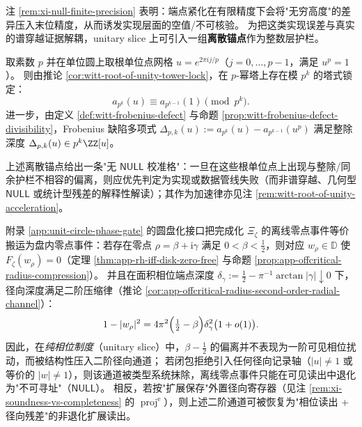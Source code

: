 \begin{remark}\label{rem:xi-null-frobenius-calibration}
注 \ref{rem:xi-null-finite-precision} 表明：端点紧化在有限精度下会将"无穷高度"的差异压入末位精度，从而诱发实现层面的空值/不可核验。
为把这类实现误差与真实的谱穿越证据解耦，unitary slice 上可引入一组\textbf{离散锚点}作为整数层护栏。
\par
取素数 \(p\) 并在单位圆上取根单位点网格
\(
u=e^{2\pi i j/p}
\)（\(j=0,\dots,p-1\)，满足 \(u^p=1\)）。
则由推论 \ref{cor:witt-root-of-unity-tower-lock}，在 \(p\)-幂塔上存在模 \(p^k\) 的塔式锁定：
\[
a_{p^k}(u)\equiv a_{p^{k-1}}(1)\pmod{p^k}.
\]
进一步，由定义 \ref{def:witt-frobenius-defect} 与命题 \ref{prop:witt-frobenius-defect-divisibility}，Frobenius 缺陷多项式
\(
\Delta_{p,k}(u):=a_{p^k}(u)-a_{p^{k-1}}(u^p)
\)
满足整除深度
\(
\Delta_{p,k}(u)\in p^k\ZZ[u]
\)。
\par
上述离散锚点给出一条"无 \(\mathsf{NULL}\) 校准格"：一旦在这些根单位点上出现与整除/同余护栏不相容的偏离，则应优先判定为实现或数据管线失败（而非谱穿越、几何型 \(\mathsf{NULL}\) 或统计型残差的解释性解读）；其作为加速律亦见注 \ref{rem:witt-root-of-unity-acceleration}。
\end{remark}

\begin{corollary}\label{cor:xi-null-second-order-radial-channel}
附录 \ref{app:unit-circle-phase-gate} 的圆盘化接口把完成化 \(\Xi_\zeta\) 的离线零点事件等价搬运为盘内零点事件：若存在零点 \(\rho=\beta+\mathrm{i}\gamma\) 满足 \(0<\beta<\tfrac12\)，则对应 \(w_\rho\in\mathbb{D}\) 使 \(F_\zeta(w_\rho)=0\)（定理 \ref{thm:app-rh-iff-disk-zero-free} 与命题 \ref{prop:app-offcritical-radius-compression}）。
并且在面积相位端点深度 \(\delta_\gamma:=\tfrac12-\pi^{-1}\arctan|\gamma|\downarrow 0\) 下，径向深度满足二阶压缩律（推论 \ref{cor:app-offcritical-radius-second-order-radial-channel}）：
\[
1-|w_\rho|^{2}=4\pi^{2}\Bigl(\tfrac12-\beta\Bigr)\delta_\gamma^{2}\bigl(1+o(1)\bigr).
\]
因此，在\emph{纯相位制度}（unitary slice）中，\(\beta-\tfrac12\) 的偏离并不表现为一阶可见相位扰动，而被结构性压入二阶径向通道；
若闭包拒绝引入任何径向记录轴（\(|u|\neq 1\) 或等价的 \(|w|\neq 1\)），则该通道被类型系统抹除，离线零点事件只能在可见读出中退化为"不可寻址"（\(\mathsf{NULL}\)）。
相反，若按"扩展保存"外置径向寄存器（见注 \ref{rem:xi-soundness-vs-completeness} 的 \(\operatorname{proj}^{\mathrm e}\)），则上述二阶通道可被恢复为"相位读出 + 径向残差"的非退化扩展读出。
\end{corollary}


